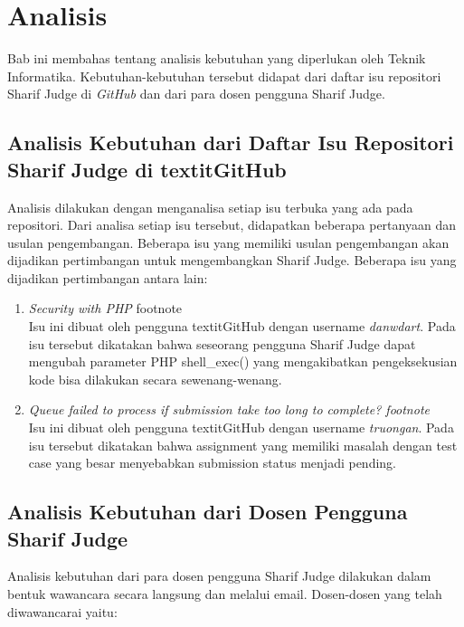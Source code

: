 \chapter{Analisis}
\label{chap:analisis}

Bab ini membahas tentang analisis kebutuhan yang diperlukan oleh Teknik Informatika. Kebutuhan-kebutuhan tersebut didapat dari daftar isu repositori Sharif Judge di \textit{GitHub} dan dari para dosen pengguna Sharif Judge.

\section{Analisis Kebutuhan dari Daftar Isu Repositori Sharif Judge di textit{GitHub}}
\label{sec:analisisgithub} 
Analisis dilakukan dengan menganalisa setiap isu terbuka yang ada pada repositori. Dari analisa setiap isu tersebut, didapatkan beberapa pertanyaan dan usulan pengembangan. Beberapa isu yang memiliki usulan pengembangan akan dijadikan pertimbangan untuk mengembangkan Sharif Judge. Beberapa isu yang dijadikan pertimbangan antara lain:
\begin{enumerate}
	\item \textit{Security with PHP} footnote\\
	Isu ini dibuat oleh pengguna textit{GitHub} dengan username \textit{danwdart}. Pada isu tersebut dikatakan bahwa seseorang pengguna Sharif Judge dapat mengubah parameter PHP shell\_exec() yang mengakibatkan pengeksekusian kode bisa dilakukan secara sewenang-wenang. %
	
	\item \textit{Queue failed to process if submission take too long to complete? footnote} \\
	Isu ini dibuat oleh pengguna textit{GitHub} dengan username \textit{truongan}. Pada isu tersebut dikatakan bahwa assignment yang memiliki masalah dengan test case yang besar menyebabkan submission status menjadi pending. %
\end{enumerate}

\section{Analisis Kebutuhan dari Dosen Pengguna Sharif Judge}
\label{sec:analisisdosen} 
Analisis kebutuhan dari para dosen pengguna Sharif Judge dilakukan dalam bentuk wawancara secara langsung dan melalui email. Dosen-dosen yang telah diwawancarai yaitu: